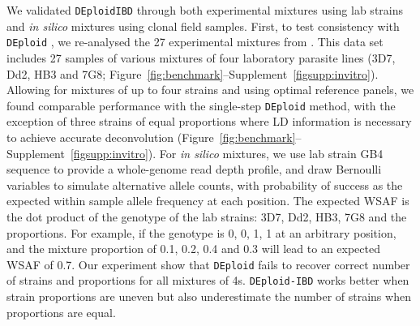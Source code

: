 \documentclass[9pt,lineno]{elife}
\begin{document}
We validated \texttt{DEploidIBD} through both experimental mixtures using lab strains and {\it in silico} mixtures using clonal field samples.  First, to test consistency with \texttt{DEploid} \citep{Zhu2017}, we re-analysed the 27 experimental mixtures from \citep{Wendler2015}.  This data set includes 27 samples of various mixtures of four laboratory parasite lines (3D7, Dd2, HB3 and 7G8; Figure~\ref{fig:benchmark}--Supplement~\ref*{figsupp:invitro}).  Allowing for mixtures of up to four strains and using optimal reference panels, we found comparable performance with the single-step \texttt{DEploid} method, with the exception of three strains of equal proportions where LD information is necessary to achieve accurate deconvolution (Figure~\ref{fig:benchmark}--Supplement~\ref*{figsupp:invitro}). For {\it in silico} mixtures, we use lab strain GB4 sequence to provide a whole-genome read depth profile, and draw Bernoulli variables to simulate alternative allele counts, with probability of success as the expected within sample allele frequency at each position. The expected WSAF is the dot product of the genotype of the lab strains: 3D7, Dd2, HB3, 7G8 and the proportions. For example, if the genotype is 0, 0, 1, 1 at an arbitrary position, and the mixture proportion of 0.1, 0.2, 0.4 and 0.3 will lead to an expected WSAF of 0.7. Our experiment show that {\tt DEploid} fails to recover correct number of strains and proportions for all mixtures of 4s. {\tt DEploid-IBD} works better when strain proportions are uneven but also underestimate the number of strains when proportions are equal.
\end{document}
